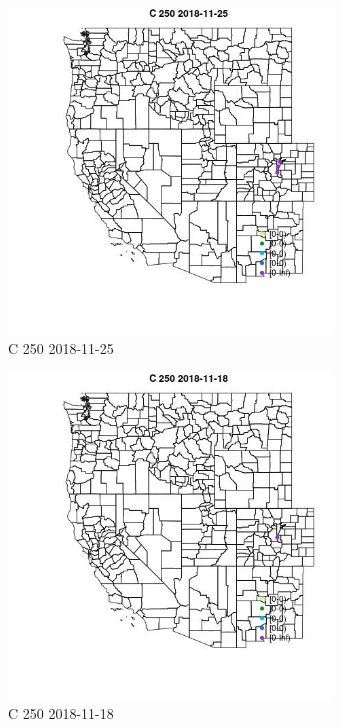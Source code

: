 \begin{figure} 
\centering  
\includegraphics[width=0.77\textwidth]{Code_Outputs/Report_ML_input_PM25_Step4_part_e_de_duplicated_aveswNAs_MapObsC_2502018-11-25.jpg} 
\caption{\label{fig:Report_ML_input_PM25_Step4_part_e_de_duplicated_aveswNAsMapObsC_2502018-11-25}C 250 2018-11-25} 
\end{figure} 
 

\begin{figure} 
\centering  
\includegraphics[width=0.77\textwidth]{Code_Outputs/Report_ML_input_PM25_Step4_part_e_de_duplicated_aveswNAs_MapObsC_2502018-11-18.jpg} 
\caption{\label{fig:Report_ML_input_PM25_Step4_part_e_de_duplicated_aveswNAsMapObsC_2502018-11-18}C 250 2018-11-18} 
\end{figure} 
 

